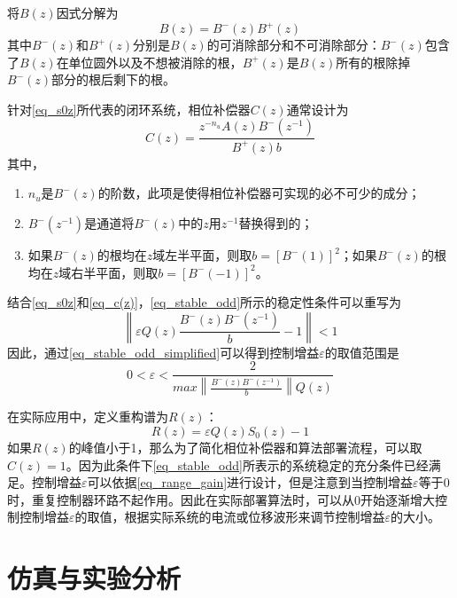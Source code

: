 \documentclass[
  lang=cn,
  degree=master,
  openany,oneside
]{nuaathesis}
\begin{document}
将$B(z)$因式分解为
\begin{equation}
B(z)=B^-(z)B^+(z)
\end{equation}
其中$B^-(z)$和$B^+(z)$分别是$B(z)$的可消除部分和不可消除部分：$B^-(z)$包含了$B(z)$在单位圆外以及不想被消除的根，$B^+(z)$是$B(z)$所有的根除掉$B^-(z)$部分的根后剩下的根。

针对\autoref{eq_s0z}所代表的闭环系统，相位补偿器$C(z)$通常设计为
\begin{equation}
\label{eq_c(z)}
C(z)=\frac{z^{-n_u}A(z)B^-(z^{-1})}{B^+(z)b}
\end{equation}
其中，
\begin{enumerate}
	\item $n_u$是$B^-(z)$的阶数，此项是使得相位补偿器可实现的必不可少的成分；
	\item $B^-(z^{-1})$是通道将$B^-(z)$中的$z$用$z^{-1}$替换得到的；
	\item 如果$B^-(z)$的根均在$z$域左半平面，则取$b={\left[ B^-(1)\right]}^2$；如果$B^-(z)$的根均在$z$域右半平面，则取$b={\left[ B^-(-1)\right]}^2$。
\end{enumerate}
结合\autoref{eq_s0z}和\autoref{eq_c(z)}，\autoref{eq_stable_odd}所示的稳定性条件可以重写为
\begin{equation}
	\label{eq_stable_odd_simplified}
	\left\|\varepsilon Q(z)\frac{B^-(z)B^-(z^{-1})}{b}-1\right\|<1
\end{equation}
因此，通过\autoref{eq_stable_odd_simplified}可以得到控制增益$\varepsilon$的取值范围是
\begin{equation}
	\label{eq_range_gain}
	0 < \varepsilon < \frac{2}{max\left \| \frac{B^-(z)B^-(z^{-1})}{b}\right \|Q(z)}
\end{equation}

在实际应用中，定义重构谱为$R(z)$：
\begin{equation}
	\label{eq_Rz}
	R(z)=\varepsilon Q(z)S_0(z)	- 1
\end{equation}
如果$R(z)$的峰值小于1，那么为了简化相位补偿器和算法部署流程，可以取$C(z)=1$。因为此条件下\autoref{eq_stable_odd}所表示的系统稳定的充分条件已经满足。控制增益$\varepsilon$可以依据\autoref{eq_range_gain}进行设计，但是注意到当控制增益$\varepsilon$等于$0$时，重复控制器环路不起作用。因此在实际部署算法时，可以从$0$开始逐渐增大控制控制增益$\varepsilon$的取值，根据实际系统的电流或位移波形来调节控制增益$\varepsilon$的大小。
\section{仿真与实验分析}
\end{document}
